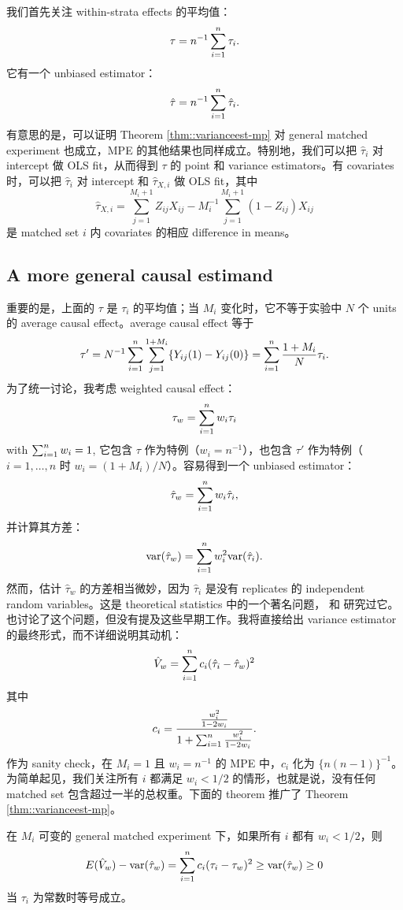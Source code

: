 我们首先关注 within-strata effects 的平均值：
$$
\tau = n^{-1} \sum_{i=1}^n \tau_i .
$$
它有一个 unbiased estimator：
$$
\hat\tau = n^{-1} \sum_{i=1}^n \hat \tau_i . 
$$
有意思的是，可以证明 Theorem \ref{thm::varianceest-mp} 对 general matched experiment 也成立，MPE 的其他结果也同样成立。特别地，我们可以把 $\hat \tau_i $ 对 intercept 做 OLS fit，从而得到 $\tau$ 的 point 和 variance estimators。有 covariates 时，可以把 $\hat \tau_i $ 对 intercept 和 $\hat\tau_{X,i}$ 做 OLS fit，其中
$$
\hat \tau_{X,i} = \sum_{j=1}^{M_i + 1} Z_{ij} X_{ij} - M_i^{-1} \sum_{j=1}^{M_i+1} (1-Z_{ij}) X_{ij}
$$
是 matched set $i$ 内 covariates 的相应 difference in means。



\subsection{A more general causal estimand}


重要的是，上面的 $\tau$ 是 $\tau_i$ 的平均值；当 $M_i$ 变化时，它不等于实验中 $N$ 个 units 的 average causal effect。average causal effect 等于
$$
\tau' = N^{-1} \sum_{i=1}^n \sum_{j=1}^{1+M_i} \{ Y_{ij}(1)-Y_{ij}(0) \} = \sum_{i=1}^n \frac{1+M_i}{N} \tau_i.
$$ 
为了统一讨论，我考虑 weighted causal effect：
$$
\tau_w =  \sum_{i=1}^n w_i \tau_i
$$
with $\sum_{i=1}^n w_i = 1$, 
它包含 $\tau$ 作为特例（$w_i = n^{-1}$），也包含 $\tau'$ 作为特例（$i=1,\ldots, n$ 时 $w_i = (1+M_i)/N $）。容易得到一个 unbiased estimator：
$$
\hat\tau_w =  \sum_{i=1}^n w_i \hat\tau_i,
$$
并计算其方差：
$$
\textup{var}(\hat\tau_w ) = \sum_{i=1}^n w_i^2 \textup{var} (\hat\tau_i ). 
$$
然而，估计 $\hat\tau_w $ 的方差相当微妙，因为 $\hat\tau_i$ 是没有 replicates 的 independent random variables。这是 theoretical statistics 中的一个著名问题，\citet{hartley1969variance} 和 \citet{rao1970estimation} 研究过它。\citet{fogarty2018mitigating} 也讨论了这个问题，但没有提及这些早期工作。我将直接给出 variance estimator 的最终形式，而不详细说明其动机：
$$
\hat{V}_w = \sum_{i=1}^n c_i (\hat\tau_i -\hat\tau_w )  ^2
$$
其中
$$
c_i = \frac{    \frac{w_i^2}{1-2w_i}   }{   1 + \sum_{i=1}^n  \frac{w_i^2}{1-2w_i} }.
$$
作为 sanity check，在 $M_i=1$ 且 $w_i = n^{-1}$ 的 MPE 中，$c_i $ 化为 $ \{  n(n-1) \}^{-1}$。为简单起见，我们关注所有 $i$ 都满足 $w_i < 1/2$ 的情形，也就是说，没有任何 matched set 包含超过一半的总权重。下面的 theorem 推广了 Theorem \ref{thm::varianceest-mp}。

\begin{theorem}
\label{thm::hadamdard-matched-experiment}
在 $M_i$ 可变的 general matched experiment 下，如果所有 $i$ 都有 $w_i < 1/2$，则
 $$
 E(\hat{V}_w ) - \textup{var}( \hat\tau_w  ) = \sum_{i=1}^n c_i (\tau_i - \tau_w )^2 \geq \textup{var}( \hat\tau_w  )  \geq 0
 $$
当 $\tau_i $ 为常数时等号成立。
\end{theorem}

